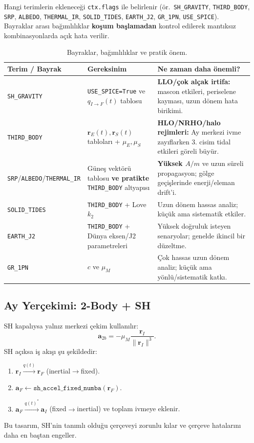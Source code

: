 Hangi terimlerin ekleneceği \texttt{ctx.flags} ile belirlenir (ör.\ \texttt{SH\_GRAVITY},
\texttt{THIRD\_BODY}, \texttt{SRP}, \texttt{ALBEDO}, \texttt{THERMAL\_IR}, \texttt{SOLID\_TIDES},
\texttt{EARTH\_J2}, \texttt{GR\_1PN}, \texttt{USE\_SPICE}). Bayraklar arası bağımlılıklar
\textbf{koşum başlamadan} kontrol edilerek mantıksız kombinasyonlarda açık hata verilir.

\begin{table}[H]
\centering
\caption{Bayraklar, bağımlılıklar ve pratik önem.}
\begin{tabular}{p{3.2cm} p{5.0cm} p{6.6cm}}
\hline
\textbf{Terim / Bayrak} & \textbf{Gereksinim} & \textbf{Ne zaman daha önemli?} \\
\hline
\texttt{SH\_GRAVITY} &
\texttt{USE\_SPICE=True} ve \(q_{I\rightarrow F}(t)\) tablosu &
\textbf{LLO/çok alçak irtifa:} mascon etkileri, periselene kayması, uzun dönem hata birikimi.\\
\texttt{THIRD\_BODY} &
\(\mathbf r_E(t), \mathbf r_S(t)\) tabloları + \(\mu_E,\mu_S\) &
\textbf{HLO/NRHO/halo rejimleri:} Ay merkezi ivme zayıflarken 3. cisim tidal etkileri göreli büyür.\\
\texttt{SRP}/\texttt{ALBEDO}/\texttt{THERMAL\_IR} &
Güneş vektörü tablosu \textbf{ve pratikte} \texttt{THIRD\_BODY} altyapısı &
\textbf{Yüksek \(A/m\)} ve uzun süreli propagasyon; gölge geçişlerinde enerji/eleman drift’i.\\
\texttt{SOLID\_TIDES} &
\texttt{THIRD\_BODY} + Love \(k_2\) &
Uzun dönem hassas analiz; küçük ama sistematik etkiler.\\
\texttt{EARTH\_J2} &
\texttt{THIRD\_BODY} + Dünya eksen/J2 parametreleri &
Yüksek doğruluk isteyen senaryolar; genelde ikincil bir düzeltme.\\
\texttt{GR\_1PN} &
\(c\) ve \(\mu_M\) &
Çok hassas uzun dönem analiz; küçük ama yönlü/sistematik katkı.\\
\hline
\end{tabular}
\end{table}

\subsection*{Ay Yerçekimi: 2-Body + SH}
SH kapalıysa yalnız merkezi çekim kullanılır:
\begin{equation}
\mathbf{a}_{2b} = -\mu_M\frac{\mathbf{r}_I}{\|\mathbf{r}_I\|^3}.
\end{equation}
SH açıksa iş akışı şu şekildedir:
\begin{enumerate}
  \item \(\mathbf{r}_I \xrightarrow{q(t)} \mathbf{r}_F\) (inertial\(\rightarrow\)fixed).
  \item \(\mathbf{a}_F \leftarrow \texttt{sh\_accel\_fixed\_numba}(\mathbf{r}_F)\).
  \item \(\mathbf{a}_F \xrightarrow{q(t)^\ast} \mathbf{a}_I\) (fixed\(\rightarrow\)inertial) ve toplam ivmeye eklenir.
\end{enumerate}
Bu tasarım, SH’nin tanımlı olduğu çerçeveyi zorunlu kılar ve çerçeve hatalarını daha en baştan engeller.

